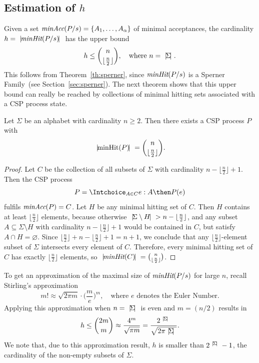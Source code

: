 \subsection{Estimation of $h$}
Given a set $\text{\it minAcc}(P/s) = \{ A_1,\dots, A_\alpha \}$ of   minimal
acceptances, the cardinality   $h = {~|\! \text{\it minHit}(P/s)\!|~}$ has the upper bound
\[
h \le \binom{n}{\lfloor\frac{n}{2}\rfloor}, \quad \text{where $n = {~|\! \Sigma\!|~}$.}
\]
This follows from Theorem~\ref{th:sperner}, since $\text{\it minHit}(P/s)$ is a
Sperner Family~(see Section~\ref{sec:sperner}). The next theorem shows that
this upper bound can really be reached by collections of minimal hitting sets
associated with a CSP process state.

\begin{theorem}
\label{th:upperboundh}
Let  $\Sigma$  be an alphabet with cardinality $n\ge 2$.  Then
there exists a CSP process $P$ with
\[
{~|\! \text{minHit}(P)\!|~} = \binom{n}{\lfloor\frac{n}{2}\rfloor}.
\]
\end{theorem}
\begin{proof}
Let $C$ be the collection of all subsets of $\Sigma$ with cardinality
$n-\lfloor{\frac{n}{2}}\rfloor+1$. Then the CSP process
\[
P = \Intchoice_{A\in C} e:A\then P(e)
\]
fulfils $\text{\it minAcc}(P) = C$. Let $H$ be any minimal hitting set of $C$. Then
$H$ contains at least $\lfloor{\frac{n}{2}}\rfloor$ elements, because
otherwise ${~|\! \Sigma\setminus H\!|~} > n-\lfloor{\frac{n}{2}}\rfloor$, and any
subset $A\subseteq \Sigma\setminus H$ with cardinality
$n-\lfloor{\frac{n}{2}}\rfloor+1$  would be contained in $C$, but satisfy
$A\cap H=\varnothing$. Since
$\lfloor{\frac{n}{2}}\rfloor+n-\lfloor{\frac{n}{2}}\rfloor+1=n+1$, we
conclude
 that any $\lfloor{\frac{n}{2}}\rfloor$-element subset of $\Sigma$
 intersects  every element of $C$.  Therefore, every minimal hitting set of $C$ has exactly $\lfloor{\frac{n}{2}}\rfloor$ elements,
so ${~|\! \text{\it minHit}(C)\!|~} = \binom{n}{\lfloor{\frac{n}{2}}\rfloor}$.
\xbox
\end{proof}
%
To get an approximation of the maximal size of $\text{\it minHit}(P/s)$ for large $n$,
recall Stirling's approximation~\cite[p.~112]{Graham:1994:CMF:562056}
\[
m! \approx \sqrt{2\pi m} \cdot \big( \frac{m}{e} \big)^m, \quad\text{where $e$ denotes the Euler Number.}
\]
Applying this approximation when $n = {~|\! \Sigma\!|~}$ is even and $m = (n/2)$
results in
\[
h \le \binom{2m}{m} \approx \frac{4^m}{\sqrt{\pi m}} =
\frac{2^{~|\! \Sigma\!|~}}{\sqrt{2\pi {~|\! \Sigma\!|~}}}.
\]
%
We note that, due to this approximation result,
$h$ is   smaller than $2^{{~|\! \Sigma\!|~}}-1$, the cardinality of the
non-empty subsets of $\Sigma$.


